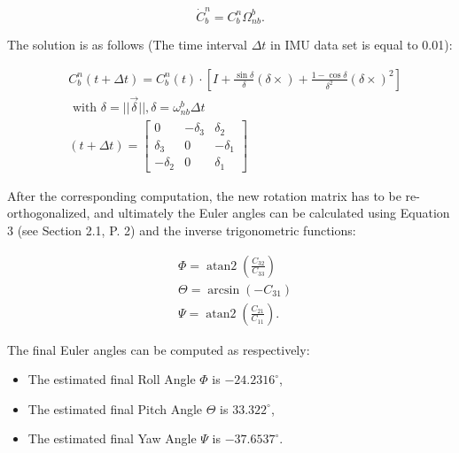 \documentclass[class=article, crop=false]{standalone}
\begin{document}
\begin{center}
\begin{equation}
    \dot{C}_b^n = C_b^n \Omega_{nb}^b.
\end{equation}
\end{center}

The solution is as follows (The time interval $\Delta t$ in IMU data set is equal to 0.01):

\begin{center}
    \begin{subequations}
    \begin{align}
    &C_b^n(t+\Delta t) = C_b^n(t) \cdot [I + \frac{\sin{\delta}}{\delta}(\delta \times) + \frac{1-\cos{\delta}}{\delta^2} (\delta \times)^2]\\
    &\text{ with } \delta = ||\vec{\delta}||, \delta = \omega_{nb}^b \Delta t \\
    &(t+\Delta t) =
    \begin{bmatrix}
    0 & -\delta_3 & \delta_2\\
    \delta_3 & 0 & -\delta_1\\
    -\delta_2 & 0 & \delta_1
    \end{bmatrix}
    \end{align}
    \end{subequations}
\end{center}

After the corresponding computation, the new rotation matrix has to be re-orthogonalized, and ultimately the Euler angles can be calculated using Equation 3 (see Section 2.1, P. 2) and the inverse trigonometric functions:

\begin{center}
    \begin{subequations}
    \begin{align}
    &\Phi = \operatorname{atan2}(\frac{C_{32}}{C_{33}})\\
    &\Theta = \arcsin{(-C_{31})}\\
    &\Psi = \operatorname{atan2}(\frac{C_{21}}{C_{11}}).
    \end{align}
    \end{subequations}
\end{center}

The final Euler angles can be computed as respectively:

\begin{itemize}
    \item The estimated final Roll Angle $\Phi$ is $-24.2316 ^\circ$,
    \item The estimated final Pitch Angle $\Theta$ is $33.322 ^\circ$,
    \item The estimated final Yaw Angle $\Psi$ is $-37.6537 ^\circ$.
\end{itemize}
\end{document}
